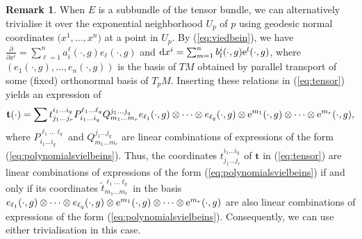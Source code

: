 \documentclass[10pt,a4paper]{amsart}
\numberwithin{equation}{section}
\theoremstyle{definition}
\newtheorem{rk}[thm]{Remark}
\begin{document}
\begin{rk} \label{lem:subbundlemetric}	When $E$ is a subbundle of the tensor bundle, we can alternatively trivialise it over the exponential neighborhood $U_p$ of $p$ using geodesic normal coordinates $\bigl(x^1, \dots, x^n\bigr)$ at a point in $U_p$.
By (\ref{eq:viedbein}), we have $\frac{ \partial}{\partial x^i}=\sum_{\ell=1}^n a_i^\ell (\cdot, g) e_\ell(\cdot,g)$ and ${\rm d}x^i=\sum_{m=1}^n b_l^i(\cdot, g) {\rm e}^l(\cdot,g) $, where $( e_1(\cdot, g), \dots, e_n(\cdot, g))$ is the basis of $TM$ obtained by parallel transport of some (fixed) orthonormal basis of $ T_pM$. Inserting these relations in
(\ref{eq:tensor}) yields an expression of
\[
\mathbf t(\cdot)=\sum t_{j_1\dots j_r}^{i_1 \dots i_q} P_{i_1\dots i_q }^{\ell_1\dots \ell_q} Q^{j_1\dots j_q }_{m_1\dots m_r} e_{\ell_1}(\cdot, g)\otimes\dots\otimes e_{\ell_q}(\cdot, g)\otimes {\rm e}^{m_1}(\cdot, g)\otimes \dots \otimes {\rm e}^{m_r}(\cdot, g),
\]
where $P_{i_1\dots i_q }^{\ell_1\dots \ell_q}$ and $Q^{j_1\dots j_q }_{m_1\dots m_r} $ are linear combinations of expressions of the form (\ref{eq:polynomialsvielbeins}). Thus, the coordinates $ t_{j_1\dots j_r}^{i_1 \dots i_q} $ of ${\mathbf t}$ in
(\ref{eq:tensor}) are linear combinations of expressions of the form (\ref{eq:polynomialsvielbeins}) if and only if its coordinates $ \tilde t_{m_1\dots m_r}^{\ell_1 \dots \ell_q} $ in the basis $ e_{\ell_1}(\cdot, g)\otimes\dots\otimes e_{\ell_q}(\cdot, g)\otimes {\rm e}^{m_1}(\cdot, g)\otimes \dots \otimes {\rm e}^{m_r}(\cdot, g)$ are also linear combinations of expressions of the form (\ref{eq:polynomialsvielbeins}).
Consequently, we can use either trivialisation in this case.
\end{rk}
\end{document}
